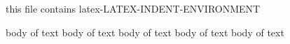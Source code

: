 
this file contains latex-LATEX-INDENT-ENVIRONMENT

\begin{myenv}
	body of text
	body of text
	body of text
	body of text
	body of text
\end{myenv}
